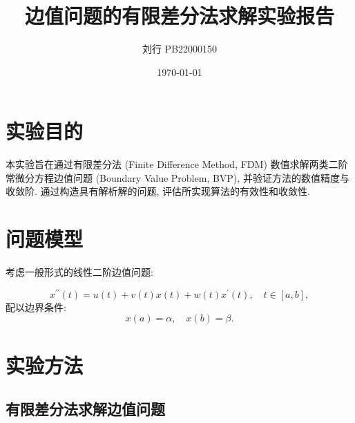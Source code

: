 \documentclass[11pt]{article}
\title{边值问题的有限差分法求解实验报告}
\author{刘行 \quad PB22000150}
\date{\today}
\begin{document}
\maketitle

\section{实验目的}

本实验旨在通过有限差分法 (Finite Difference Method, FDM) 数值求解两类二阶常微分方程边值问题 (Boundary Value Problem, BVP), 并验证方法的数值精度与收敛阶. 通过构造具有解析解的问题, 评估所实现算法的有效性和收敛性.

\section{问题模型}

考虑一般形式的线性二阶边值问题:

\begin{equation*}
	x^{\prime\prime}(t) = u(t) + v(t) x(t) + w(t) x^{\prime}(t), \quad t \in [a, b],
\end{equation*}
配以边界条件:
\begin{equation*}
	x(a) = \alpha, \quad x(b) = \beta.
\end{equation*}

\section{实验方法}

\subsection{有限差分法求解边值问题}
\end{document}
